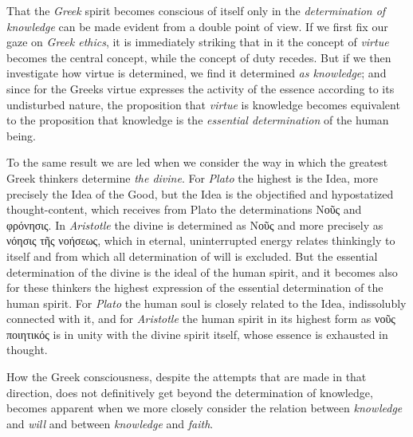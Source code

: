 \documentclass[12pt,a4paper]{book}
\begin{document}
That the \emph{Greek} spirit becomes conscious of itself only in the
\emph{determination of knowledge} can be made evident from a double point of
view. If we first fix our gaze on \emph{Greek ethics}, it is immediately
striking that in it the concept of \emph{virtue} becomes the central concept,
while the concept of duty recedes. But if we then investigate how virtue
is determined, we find it determined \emph{as knowledge}; and since for the
Greeks virtue expresses the activity of the essence according to its
undisturbed nature, the proposition that \emph{virtue} is knowledge becomes
equivalent to the proposition that knowledge is the \emph{essential
determination} of the human being.

To the same result we are led when we consider the way in which the
greatest Greek thinkers determine \emph{the divine}. For \emph{Plato} the highest is
the Idea, more precisely the Idea of the Good, but the Idea is the
objectified and hypostatized thought-content, which receives from Plato
the determinations Νοῦς and φρόνησις. In \emph{Aristotle}
the divine is determined as Νοῦς and more precisely as
νόησις τῆς νοήσεως, which in eternal, uninterrupted energy relates
thinkingly to itself and from which all determination of will is
excluded. But the essential determination of the divine is the ideal of
the human spirit, and it becomes also for these thinkers the highest
expression of the essential determination of the human spirit. For \emph{Plato}
the human soul is closely related to the Idea, indissolubly connected
with it, and for \emph{Aristotle} the human spirit in its highest form as
νοῦς ποιητικός is in unity with the divine spirit itself,
whose essence is exhausted in thought.

How the Greek consciousness, despite the attempts that are made in that
direction, does not definitively get beyond the determination of
knowledge, becomes apparent when we more closely consider the relation
between \emph{knowledge} and \emph{will} and between \emph{knowledge} and \emph{faith}.
\end{document}

